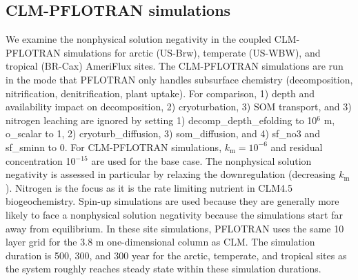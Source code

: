 \documentclass[gmd, manuscript]{copernicus}
\begin{document}
\subsection{CLM-PFLOTRAN simulations}
We examine the nonphysical solution negativity in the coupled CLM-PFLOTRAN simulations
for arctic (US-Brw), temperate (US-WBW), and tropical (BR-Cax) AmeriFlux sites. 
The CLM-PFLOTRAN simulations are run in the mode that PFLOTRAN only handles
subsurface chemistry (decomposition, nitrification, denitrification, 
plant uptake). For comparison, 1) depth and 
availability impact on decomposition, 2) cryoturbation, 3) SOM transport,
and 3) nitrogen leaching 
are ignored by setting 1) decomp\_depth\_efolding to 10$^6$ m, o\_scalar to 1,
2) cryoturb\_diffusion, 3) som\_diffusion, and 4) sf\_no3 and sf\_sminn to 0. For CLM-PFLOTRAN
simulations, $k_\text{m}=10^{-6}$ and residual concentration 10$^{-15}$ are
used for the base case. The nonphysical solution negativity is assessed in particular
by relaxing the downregulation (decreasing $k_\text{m}$). Nitrogen is the focus
as it is the rate limiting nutrient in CLM4.5 biogeochemistry. Spin-up
simulations are used because they are generally more likely to face a nonphysical solution negativity 
because the simulations start far away from equilibrium. In these site
simulations, PFLOTRAN uses the same 10 layer grid for the 3.8 m one-dimensional
column as CLM. The simulation duration is 500, 300, and 300 year for the
arctic, temperate, and tropical sites as the system roughly reaches steady state
within these simulation durations. 

\end{document}
